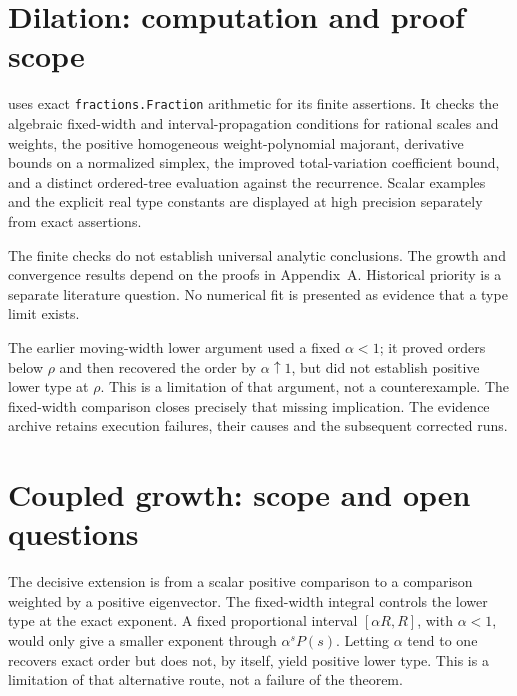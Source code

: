 \hypertarget{computational-contract-and-limitations}{%
\section*{Dilation: computation and proof scope}\label{computational-contract-and-limitations}}

 uses exact \texttt{fractions.Fraction}
arithmetic for its finite assertions. It checks the algebraic
fixed-width and interval-propagation conditions for rational scales and
weights, the positive homogeneous weight-polynomial majorant, derivative
bounds on a normalized simplex, the improved total-variation coefficient
bound, and a distinct ordered-tree evaluation against the recurrence.
Scalar examples and the explicit real type constants are displayed at
high precision separately from exact assertions.

The finite checks do not establish universal analytic conclusions.
The growth and convergence results depend on the proofs in Appendix~A.
Historical priority is a separate literature question. No numerical fit is
presented as evidence that a type limit exists.

The earlier moving-width lower argument used a fixed \(\alpha<1\); it
proved orders below \(\rho\) and then recovered the order by
\(\alpha\uparrow1\), but did not establish positive lower type at
\(\rho\). This is a limitation of that argument, not a counterexample.
The fixed-width comparison closes precisely that missing implication.
The evidence archive retains execution failures, their causes and the
subsequent corrected runs.


\hypertarget{v11-coupled_growth_full-proof-provenance-and-remaining-questions}{%
\section*{Coupled growth: scope and open questions}\label{v11-coupled_growth_full-proof-provenance-and-remaining-questions}}

The decisive extension is from a scalar positive comparison to a
comparison weighted by a positive eigenvector. The fixed-width integral
controls the lower type at the exact exponent. A fixed proportional
interval \([\alpha R,R]\), with \(\alpha<1\), would only give a smaller
exponent through \(\alpha^sP(s)\). Letting \(\alpha\) tend to one
recovers exact order but does not, by itself, yield positive lower type.
This is a limitation of that alternative route, not a failure of the
theorem.

